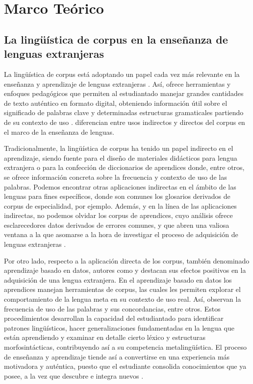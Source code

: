 \section{Marco Teórico}\label{sec-marcoteórico.tex}
\subsection{La lingüística de corpus en la enseñanza de lenguas extranjeras} \label{sub-sec-lingüísticadecorpus}

La lingüística de corpus está adoptando un papel cada vez más relevante
en la enseñanza y aprendizaje de lenguas extranjeras \cite{sinclair2004how,okeeffe2007corpus,romer2009corpus,szudarski2018corpus}. Así, ofrece herramientas y enfoques pedagógicos que
permiten al estudiantado manejar grandes cantidades de texto auténtico
en formato digital, obteniendo información útil sobre el significado de
palabras clave y determinadas estructuras gramaticales partiendo de su
contexto de uso \cite{hanks2013}. \textcite{mcenery2011what} diferencian entre
usos indirectos y directos del corpus en el marco de la enseñanza de
lenguas.

Tradicionalmente, la lingüística de corpus ha tenido un papel indirecto
en el aprendizaje, siendo fuente para el diseño de materiales didácticos
para lengua extranjera o para la confección de diccionarios de
aprendices donde, entre otros, se ofrece información concreta sobre la
frecuencia y contexto de uso de las palabras. Podemos encontrar otras
aplicaciones indirectas en el ámbito de las lenguas para fines
específicos, donde son comunes los glosarios derivados de corpus de
especialidad, por ejemplo. Además, y en la línea de las aplicaciones
indirectas, no podemos olvidar los corpus de aprendices, cuyo análisis
ofrece esclarecedores datos derivados de errores comunes, y que abren
una valiosa ventana a la que asomarse a la hora de investigar el proceso
de adquisición de lenguas extranjeras \cite{meunier2002pedagogical}.

Por otro lado, respecto a la aplicación directa de los corpus, también
denominado aprendizaje basado en datos, autores como \textcite{gabrielatos2005corpora}
y \textcite{bernardini2004corpora} destacan sus efectos positivos en la adquisición de
una lengua extranjera. En el aprendizaje basado en datos los aprendices
manejan herramientas de corpus, las cuales les permiten explorar el
comportamiento de la lengua meta en su contexto de uso real. Así,
observan la frecuencia de uso de las palabras y sus concordancias, entre
otros. Estos procedimientos desarrollan la capacidad del estudiantado
para identificar patrones lingüísticos, hacer generalizaciones
fundamentadas en la lengua que están aprendiendo y examinar en detalle
cierto léxico y estructuras morfosintácticas, contribuyendo así a su
competencia metalingüística. El proceso de enseñanza y aprendizaje
tiende así a convertirse en una experiencia más motivadora y auténtica,
puesto que el estudiante consolida conocimientos que ya posee, a la vez
que descubre e integra nuevos \cite{boulton2012what}.

